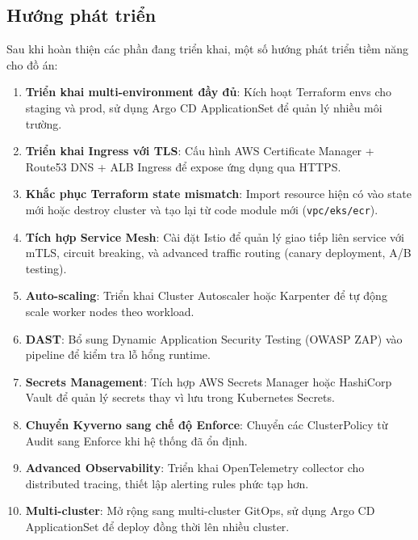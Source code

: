 \documentclass[13pt,a4paper,twoside]{extarticle}
\begin{document}
\subsection{Hướng phát triển}

Sau khi hoàn thiện các phần đang triển khai, một số hướng phát triển tiềm năng cho đồ án:

\begin{enumerate}[leftmargin=*,nosep]
  \item \textbf{Triển khai multi-environment đầy đủ}: Kích hoạt Terraform envs cho staging và prod, sử dụng Argo CD ApplicationSet để quản lý nhiều môi trường.

  \item \textbf{Triển khai Ingress với TLS}: Cấu hình AWS Certificate Manager + Route53 DNS + ALB Ingress để expose ứng dụng qua HTTPS.

  \item \textbf{Khắc phục Terraform state mismatch}: Import resource hiện có vào state mới hoặc destroy cluster và tạo lại từ code module mới (\texttt{vpc/eks/ecr}).

  \item \textbf{Tích hợp Service Mesh}: Cài đặt Istio để quản lý giao tiếp liên service với mTLS, circuit breaking, và advanced traffic routing (canary deployment, A/B testing).

  \item \textbf{Auto-scaling}: Triển khai Cluster Autoscaler hoặc Karpenter để tự động scale worker nodes theo workload.

  \item \textbf{DAST}: Bổ sung Dynamic Application Security Testing (OWASP ZAP) vào pipeline để kiểm tra lỗ hổng runtime.

  \item \textbf{Secrets Management}: Tích hợp AWS Secrets Manager hoặc HashiCorp Vault để quản lý secrets thay vì lưu trong Kubernetes Secrets.

  \item \textbf{Chuyển Kyverno sang chế độ Enforce}: Chuyển các ClusterPolicy từ Audit sang Enforce khi hệ thống đã ổn định.

  \item \textbf{Advanced Observability}: Triển khai OpenTelemetry collector cho distributed tracing, thiết lập alerting rules phức tạp hơn.

  \item \textbf{Multi-cluster}: Mở rộng sang multi-cluster GitOps, sử dụng Argo CD ApplicationSet để deploy đồng thời lên nhiều cluster.
\end{enumerate}
\end{document}
